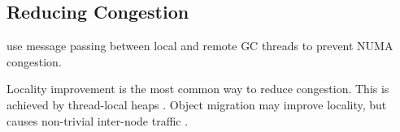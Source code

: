 \subsection{Reducing Congestion}

\cite{gidra15numagic} use message passing between local and remote GC 
threads to prevent NUMA congestion.

Locality improvement is the most common way to reduce congestion. This is
achieved by thread-local heaps 
\cite{marlow11multicore,domani02thread}. 
Object migration may improve locality, but causes non-trivial inter-node traffic \cite{tikir05numa}.